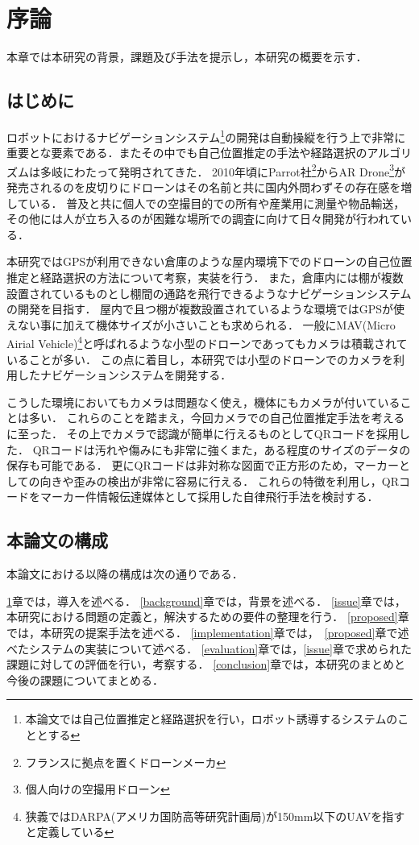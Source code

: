 \chapter{序論}
\label{introduction}

本章では本研究の背景，課題及び手法を提示し，本研究の概要を示す．

\section{はじめに}
ロボットにおけるナビゲーションシステム\footnote{本論文では自己位置推定と経路選択を行い，ロボット誘導するシステムのこととする}の開発は自動操縦を行う上で非常に重要とな要素である．またその中でも自己位置推定の手法や経路選択のアルゴリズムは多岐にわたって発明されてきた．
2010年頃にParrot社\footnote{フランスに拠点を置くドローンメーカ}からAR Drone\footnote{個人向けの空撮用ドローン}が発売されるのを皮切りにドローンはその名前と共に国内外問わずその存在感を増している．
普及と共に個人での空撮目的での所有や産業用に測量や物品輸送，その他には人が立ち入るのが困難な場所での調査に向けて日々開発が行われている．

本研究ではGPSが利用できない倉庫のような屋内環境下でのドローンの自己位置推定と経路選択の方法について考察，実装を行う．
また，倉庫内には棚が複数設置されているものとし棚間の通路を飛行できるようなナビゲーションシステムの開発を目指す．
屋内で且つ棚が複数設置されているような環境ではGPSが使えない事に加えて機体サイズが小さいことも求められる．
一般にMAV(Micro Airial Vehicle)\footnote{狭義ではDARPA(アメリカ国防高等研究計画局)が150mm以下のUAVを指すと定義している}と呼ばれるような小型のドローンであってもカメラは積載されていることが多い．
この点に着目し，本研究では小型のドローンでのカメラを利用したナビゲーションシステムを開発する．

こうした環境においてもカメラは問題なく使え，機体にもカメラが付いていることは多い．
これらのことを踏まえ，今回カメラでの自己位置推定手法を考えるに至った．
その上でカメラで認識が簡単に行えるものとしてQRコードを採用した．
QRコードは汚れや傷みにも非常に強くまた，ある程度のサイズのデータの保存も可能である．
更にQRコードは非対称な図面で正方形のため，マーカーとしての向きや歪みの検出が非常に容易に行える．
これらの特徴を利用し，QRコードをマーカー件情報伝達媒体として採用した自律飛行手法を検討する．


\section{本論文の構成}

本論文における以降の構成は次の通りである．

\ref{introduction}章では，導入を述べる．
\ref{background}章では，背景を述べる．
\ref{issue}章では，本研究における問題の定義と，解決するための要件の整理を行う．
\ref{proposed}章では，本研究の提案手法を述べる．
\ref{implementation}章では，~\ref{proposed}章で述べたシステムの実装について述べる．
\ref{evaluation}章では，\ref{issue}章で求められた課題に対しての評価を行い，考察する．
\ref{conclusion}章では，本研究のまとめと今後の課題についてまとめる．


